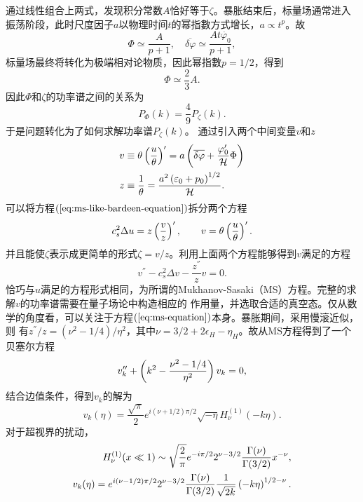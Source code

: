 通过线性组合上两式，发现积分常数$A$恰好等于$\zeta$。暴胀结束后，标量场通常进入
振荡阶段，此时尺度因子$a$以物理时间$t$的幂指數方式增长，$a\propto
t^{p}$。故
\begin{equation}
  \Phi \simeq \frac{A}{p+1},\quad 
  \overline{\delta\varphi}\simeq \frac{At\dot{\varphi_0}}{p+1},
\end{equation}
标量场最终将转化为极端相对论物质，因此幂指數$p=1 /2$，得到
\begin{equation}
  \Phi \simeq \frac{2}{3}A. 
\end{equation}
因此$\Phi$和$\zeta$的功率谱之间的关系为
\begin{equation}
  P_{\Phi}(k) = \frac{4}{9}P_{\zeta}(k). 
\end{equation}
于是问题转化为了如何求解功率谱$P_{\zeta}(k)$。
通过引入两个中间变量$v$和$z$
\begin{align}
  v&\equiv\theta\left(\frac{u}{\theta}\right)^{\prime} 
  =a\left(\overline{\delta\varphi} +
  \frac{\varphi^\prime_0}{\mathcal{H}}\Phi\right) \\
  z&\equiv \frac{1}{\theta} = \frac{a^2\left(\varepsilon_0+p_0\right)^{1
  /2}}{\mathcal{H}}.
\end{align}
可以将方程$(\ref{eq:ms-like-bardeen-equation})$拆分两个方程
\begin{equation}
  c_{s}^2\Delta u=z\left(\frac{v}{z}\right)^{\prime},\qquad
  v=\theta\left(\frac{u}{\theta}\right)^{\prime}.
\end{equation}
并且能使$\zeta$表示成更简单的形式$\zeta=v
/z$。利用上面两个方程能够得到$v$满足的方程
\begin{equation}
  \label{eq:ms-equation}
  v^{\dprime}- c_s^2\Delta v - \frac{z^{\dprime}}{z}v = 0.
\end{equation}
恰巧与$u$满足的方程形式相同，为所谓的Mukhanov-Sasaki（MS）方程。完整的求解$v$的功率谱需要在量子场论中构造相应的
作用量，并选取合适的真空态。仅从数学的角度看，可以关注于方程$(\ref{eq:ms-equation})$本身。暴胀期间，采用慢滚近似，则
有$z^{\dprime} /z = (\nu^2-1 /4) /\eta^2$，其中$\nu=3
/2+2\epsilon_H-\eta_H$。故从MS方程得到了一个贝塞尔方程
\begin{equation}
  v^{\prime\prime}_k +\left(k^2-\frac{\nu^2-1 /4}{\eta^2}\right)v_{k} =0, 
\end{equation}
结合边值条件，得到$v_{k}$的解为
\begin{equation}
  v_{k}(\eta) = \frac{\sqrt{\pi}}{2}e^{i(\nu+1 /2)\pi
  /2}\sqrt{-\eta}H^{(1)}_{\nu}(-k\eta).
\end{equation}
对于超视界的扰动，
\begin{align}
  H^{(1)}_{\nu}(x\ll 1) \sim \sqrt{\frac{2}{\pi}}e^{-i\pi /2}2^{\nu-3 /2}
  \frac{\Gamma(\nu)}{\Gamma(3 /2)}x^{-\nu}, \\
  v_{k}(\eta)=e^{i(\nu-1 /2)\pi /2}2^{\nu-3 /2}
  \frac{\Gamma(\nu)}{\Gamma(3 /2)} \frac{1}{\sqrt{2k}}\left(-k\eta\right)^{1
  /2-\nu}.
\end{align}
